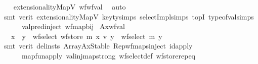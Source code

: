 \begin{isabellebody}
\ \ \isamarkupfalse%
\ extensionalityMapV\ wf{\isacharunderscore}{\kern0pt}wf{\isacharunderscore}{\kern0pt}val\ \isamarkupfalse%
\ auto\isanewline
\ \ \isamarkupfalse%
\ {\isacharparenleft}{\kern0pt}smt\ {\isacharparenleft}{\kern0pt}verit{\isacharparenright}{\kern0pt}\ extensionalityMapV\ key{\isacharunderscore}{\kern0pt}ty{\isachardot}{\kern0pt}simps{\isacharparenleft}{\kern0pt}{}{\isacharparenright}{\kern0pt}\ selectImpl{\isachardot}{\kern0pt}simps\ top{}I\ type{\isacharunderscore}{\kern0pt}of{\isacharunderscore}{\kern0pt}val{\isachardot}{\kern0pt}simps{\isacharparenleft}{\kern0pt}{}{\isacharparenright}{\kern0pt}\isanewline
\ \ \ \ \ \ val{\isachardot}{\kern0pt}pred{\isacharunderscore}{\kern0pt}inject{\isacharparenleft}{\kern0pt}{}{\isacharcomma}{\kern0pt}{}{\isacharcomma}{\kern0pt}{}{\isacharparenright}{\kern0pt}\ wf{\isacharunderscore}{\kern0pt}map{\isacharunderscore}{\kern0pt}bij{\isacharparenright}{\kern0pt}%
\endisatagproof
{\isafoldproof}%
%
\isadelimproof
\isanewline
%
\endisadelimproof
\isanewline
{}\isamarkupfalse%
\ Ax{}{\isacharunderscore}{\kern0pt}wf{\isacharunderscore}{\kern0pt}val{\isacharcolon}{\kern0pt}\isanewline
\ \ \ {\isachardoublequoteopen}x\ {\isacharequal}{\kern0pt}\ y\ {\isasymor}\ wf{\isacharunderscore}{\kern0pt}select\ {\isacharparenleft}{\kern0pt}wf{\isacharunderscore}{\kern0pt}store\ m\ x\ v{\isacharparenright}{\kern0pt}\ y\ {\isacharequal}{\kern0pt}\ wf{\isacharunderscore}{\kern0pt}select\ m\ y{\isachardoublequoteclose}\isanewline
%
\isadelimproof
\ \ %
\endisadelimproof
%
\isatagproof
{}\isamarkupfalse%
\ {\isacharparenleft}{\kern0pt}smt\ {\isacharparenleft}{\kern0pt}verit{\isacharcomma}{\kern0pt}\ del{\isacharunderscore}{\kern0pt}insts{\isacharparenright}{\kern0pt}\ ArrayAxStable\ Rep{\isacharunderscore}{\kern0pt}wf{\isacharunderscore}{\kern0pt}maps{\isacharunderscore}{\kern0pt}inject\ id{\isacharunderscore}{\kern0pt}apply\isanewline
\ \ \ \ \ \ map{\isacharunderscore}{\kern0pt}fun{\isacharunderscore}{\kern0pt}apply\ val{\isachardot}{\kern0pt}inj{\isacharunderscore}{\kern0pt}map{\isacharunderscore}{\kern0pt}strong\ wf{\isacharunderscore}{\kern0pt}select{\isacharunderscore}{\kern0pt}def\ wf{\isacharunderscore}{\kern0pt}store{\isachardot}{\kern0pt}rep{\isacharunderscore}{\kern0pt}eq{\isacharparenright}{\kern0pt}%
\endisatagproof
{\isafoldproof}%
%
\isadelimproof
%
\endisadelimproof
%
\isadelimdocument
%
\endisadelimdocument
%
\isatagdocument

\end{isabellebody}
